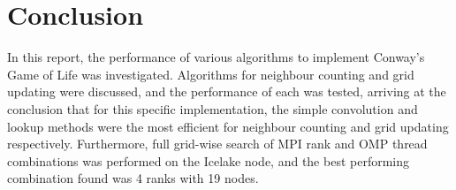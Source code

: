 
\section{Conclusion}\label{sec:conclusion}
In this report, the performance of various algorithms to implement Conway's Game of Life was investigated.
Algorithms for neighbour counting and grid updating were discussed, and the performance of each was tested, arriving at
the conclusion that for this specific implementation, the simple convolution and lookup methods were the most efficient
for neighbour counting and grid updating respectively.
Furthermore, full grid-wise search of MPI rank and OMP thread combinations was performed on the Icelake node, and the best
performing combination found was 4 ranks with 19 nodes.






